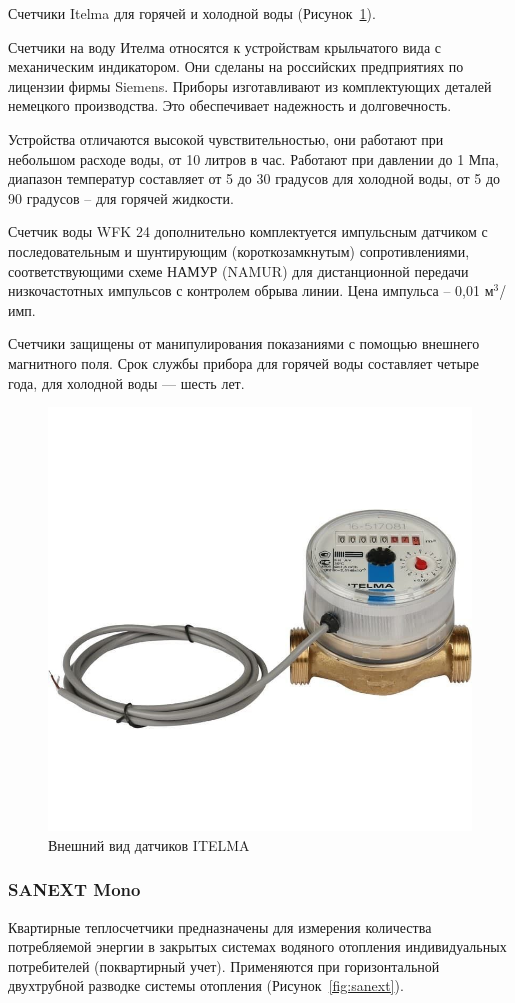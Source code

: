 Счетчики Itelma для горячей и холодной воды (Рисунок~\ref{fig:itelma}). 

Счетчики на воду Ителма относятся к устройствам крыльчатого вида с механическим индикатором. Они сделаны на российских предприятиях по лицензии фирмы Siemens. Приборы изготавливают из комплектующих деталей немецкого производства. Это обеспечивает надежность и долговечность. \cite{itelma}

Устройства отличаются высокой чувствительностью, они работают при небольшом расходе воды, от 10 литров в час. Работают при давлении до 1 Мпа, диапазон температур составляет от 5 до 30 градусов для холодной воды, от 5 до 90 градусов – для горячей жидкости.

Счетчик воды WFK 24 дополнительно комплектуется импульсным датчиком с последовательным и шунтирующим (короткозамкнутым) сопротивлениями, соответствующими схеме НАМУР (NAMUR) для дистанционной передачи низкочастотных импульсов с контролем обрыва линии. \cite{saures}
Цена импульса – 0,01 м$^{3}$/имп. 

Счетчики защищены от манипулирования показаниями с помощью внешнего магнитного поля. Срок службы прибора для горячей воды составляет четыре года, для холодной воды --- шесть лет.

\begin{figure}[H]
	\centering
	\includegraphics[width=0.5\linewidth]{pics/itelma}
	\caption{Внешний вид датчиков ITELMA}
	\label{fig:itelma}
\end{figure}

\subsubsection{SANEXT Mono}

Квартирные теплосчетчики предназначены для измерения количества потребляемой энергии в закрытых системах водяного отопления индивидуальных потребителей (поквартирный учет). Применяются при горизонтальной двухтрубной разводке системы отопления (Рисунок~\ref{fig:sanext}).

